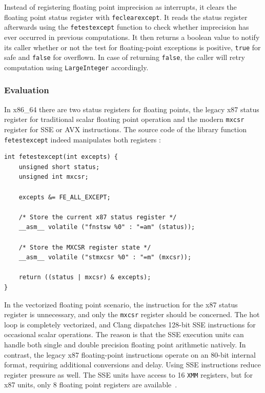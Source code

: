\documentclass[logo,bsc,singlespacing,parskip]{infthesis}
\newcommand{\mxcsr}{\texttt{mxcsr}}
\newcommand{\xmm}{\texttt{XMM}}
\begin{document}
Instead of registering floating point imprecision as interrupts, it clears the
floating point status register with \texttt{feclearexcept}. It reads the status
register afterwards using the \texttt{fetestexcept} function to check whether
imprecision has ever occurred in previous computations. It then returns a
boolean value to notify its caller whether or not the test for floating-point
exceptions is positive, \texttt{true} for safe and \texttt{false} for overflown.
In case of returning \texttt{false}, the caller will retry computation using
\texttt{LargeInteger} accordingly. 



\subsubsection{Evaluation}
In x86\_64 there are two status registers for floating points, the legacy x87
status register for traditional scalar floating point operation and the modern
\mxcsr{} register for SSE or AVX instructions. The source code
of the library function \texttt{fetestexcept} indeed manipulates both registers
\cite{fenvlib}: 
\begin{verbatim}
int fetestexcept(int excepts) {
    unsigned short status;
    unsigned int mxcsr;

    excepts &= FE_ALL_EXCEPT;

    /* Store the current x87 status register */
    __asm__ volatile ("fnstsw %0" : "=am" (status));

    /* Store the MXCSR register state */
    __asm__ volatile ("stmxcsr %0" : "=m" (mxcsr));

    return ((status | mxcsr) & excepts);
}
\end{verbatim}


In the vectorized floating point scenario, the instruction for the x87 status
register is unnecessary, and only the \mxcsr{} register should be concerned. The
hot loop is completely vectorized, and Clang dispatches 128-bit SSE
instructions for occasional scalar operations. The reason is that the SSE
execution units can handle both single and double precision floating point
arithmetic natively. In contrast, the legacy x87 floating-point instructions operate
on an 80-bit internal format, requiring additional conversions and delay. Using
SSE instructions reduce register pressure as well. The SSE
units have access to 16 \xmm{} registers, but for x87 units, only 8
floating point registers are available~\cite{x87-bad}. 
\end{document}
